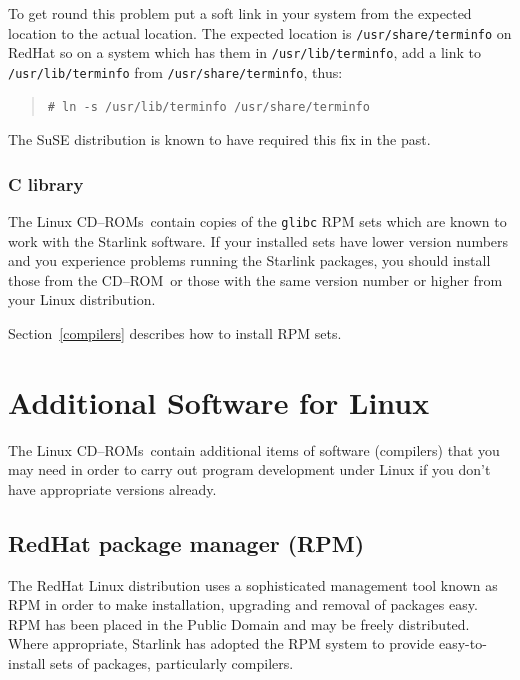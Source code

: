 \documentclass[twoside,11pt]{article}
\newcommand{\xlabel}[1]{}
\renewcommand{\_}{\texttt{\symbol{95}}}
\newcommand{\cdrom}{CD--ROM}
\newcommand{\cdrom}{CD-ROM}
\newcommand{\cdroms}{CD--ROMs}
\newcommand{\cdroms}{CD-ROMs}
\begin{document}
To get round this problem put a soft link in your system from the
expected location to the actual location.  The expected location is
\texttt{/usr/share/terminfo} on RedHat so on a system which has them
in \texttt{/usr/lib/terminfo}, add a link to \texttt{/usr/lib/terminfo}
from \texttt{/usr/share/terminfo}, thus:

\begin{quote}
\begin{verbatim}
# ln -s /usr/lib/terminfo /usr/share/terminfo
\end{verbatim}
\end{quote}

The SuSE distribution is known to have required this fix in the past.

\subsubsection{C library}

The Linux \cdroms\ contain copies of the \texttt{glibc} RPM sets
which are known to work with the Starlink software.  If your installed
sets have lower version numbers and you experience problems running the
Starlink packages, you should install those from the \cdrom\ or those
with the same version number or higher from your Linux distribution. 

Section~\ref{compilers} describes how to install RPM sets.

\newpage
\section{\xlabel{additional_software_for_linux}Additional Software for Linux}
\label{additional_software_for_linux}

The Linux \cdroms\ contain additional items of software
(compilers) that you may need in order to carry out program
development under Linux if you don't have appropriate versions
already.

\subsection{\label{rpm}\xlabel{rpm}RedHat package manager (RPM)}

The RedHat Linux distribution uses a sophisticated management tool
known as RPM in order to make installation, upgrading and removal of
packages easy.  RPM has been placed in the Public Domain and may be freely
distributed.  Where appropriate, Starlink has adopted the RPM system
to provide easy-to-install sets of packages, particularly compilers.
\end{document}
